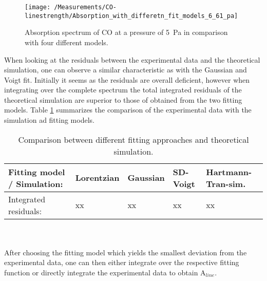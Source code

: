 \begin{figure}[H]
	\centering
	\texttt{[image: /Measurements/CO-linestrength/Absorption\_with\_differetn\_fit\_models\_6\_61\_pa]}
	\caption{Absorption spectrum of CO at a pressure of \mbox{5 Pa} in comparison with four different models.}
	\label{fig:lineshape_fit_models_6_61Pa}
\end{figure}
\noindent
When looking at the residuals between the experimental data and the theoretical simulation, one can observe a similar characteristic as with the Gaussian and Voigt fit. Initially it seems as the residuals are overall deficient, however when integrating over the complete spectrum the total integrated residuals of the theoretical simulation are superior to those of obtained from the two fitting models. Table \ref{table:fitting_residuals_abs} summarizes the comparison of the experimental data with the simulation ad fitting models.
\begin{table}
	\begin{center}
		\begin{tabular}{ lllll }
			\toprule
			Fitting model / Simulation: & Lorentzian & Gaussian & SD-Voigt  & Hartmann-Tran-sim. \\
			\midrule
			Integrated residuals: & xx& xx& xx &  xx\\
			\bottomrule
		\end{tabular}
	\end{center}
	\caption{Comparison between different fitting approaches and theoretical simulation.}
	\label{table:fitting_residuals_abs}
\end{table}
\\\\
\noindent
After choosing the fitting model which yields the smallest deviation from the experimental data, one can then either integrate over the respective fitting function or directly integrate the experimental data to obtain A$_{line}$. 

